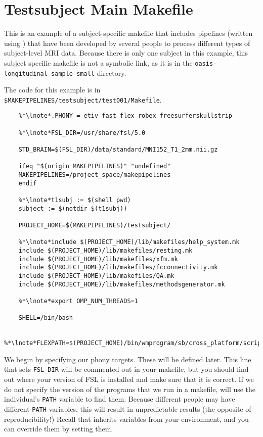 \section{Testsubject Main Makefile}
\label{example:testsubjectmakefile}

This is an example of a subject-specific makefile that includes
pipelines (written using \maken{}) that have been developed by several people to process different types of
subject-level MRI data. Because there is only one subject in
this example, this subject specific makefile is not a symbolic link,
as it is in the \texttt{oasis-longitudinal-sample-small} directory. 

The code for this example is in \texttt{\$MAKEPIPELINES/testsubject/test001/Makefile}. 

\setcounter{codehighlight}{0} %
\begin{lstlisting}
	%*\lnote*.PHONY = etiv fast flex robex freesurferskullstrip 

	%*\lnote*FSL_DIR=/usr/share/fsl/5.0 

	STD_BRAIN=$(FSL_DIR)/data/standard/MNI152_T1_2mm.nii.gz 

	ifeq "$(origin MAKEPIPELINES)" "undefined"
	MAKEPIPELINES=/project_space/makepipelines 
	endif 

	%*\lnote*t1subj := $(shell pwd) 
	subject := $(notdir $(t1subj)) 

	PROJECT_HOME=$(MAKEPIPELINES)/testsubject/

	%*\lnote*include $(PROJECT_HOME)/lib/makefiles/help_system.mk 
	include $(PROJECT_HOME)/lib/makefiles/resting.mk 
	include $(PROJECT_HOME)/lib/makefiles/xfm.mk 
	include $(PROJECT_HOME)/lib/makefiles/fcconnectivity.mk 
	include $(PROJECT_HOME)/lib/makefiles/QA.mk 
	include $(PROJECT_HOME)/lib/makefiles/methodsgenerator.mk

	%*\lnote*export OMP_NUM_THREADS=1 

	SHELL=/bin/bash 

	%*\lnote*FLEXPATH=$(PROJECT_HOME)/bin/wmprogram/sb/cross_platform/scripts

\end{lstlisting}

 We begin by specifying our phony targets. These will be
defined later. 
 This line that sets \texttt{FSL_DIR} will be commented out in
your makefile, but you should find out where your version of FSL is
installed and make sure that it is correct. If we do not specify the
version of the programs that we run in a makefile, \maken{} will use
the individual's \texttt{PATH} variable to find them. Because
different people may have different \texttt{PATH} variables, this will
result in unpredictable results (the opposite of reproducibility!)
Recall that \maken{} inherits variables from your environment, and you
can override them by setting them.

